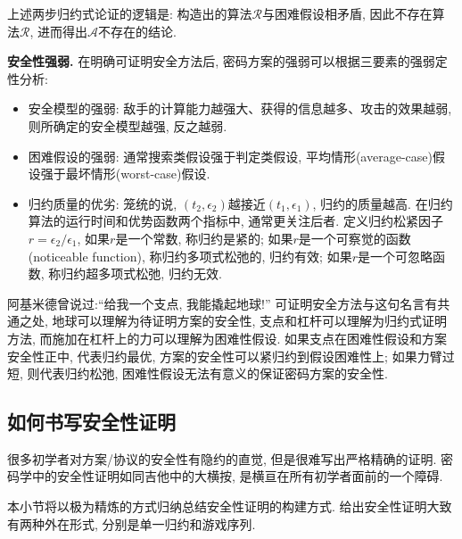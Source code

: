 上述两步归约式论证的逻辑是: 构造出的算法$\mathcal{R}$与困难假设相矛盾, 因此不存在算法$\mathcal{R}$, 进而得出$\mathcal{A}$不存在的结论. 

\begin{trivlist}
\item \textbf{安全性强弱.} 在明确可证明安全方法后, 密码方案的强弱可以根据三要素的强弱定性分析: 
\begin{itemize}
	\item 安全模型的强弱: 敌手的计算能力越强大、获得的信息越多、攻击的效果越弱, 则所确定的安全模型越强, 反之越弱. 
	\item 困难假设的强弱: 通常搜索类假设强于判定类假设, 平均情形(average-case)假设强于最坏情形(worst-case)假设. 
	\item 归约质量的优劣: 笼统的说, $(t_2, \epsilon_2)$越接近$(t_1, \epsilon_1)$, 归约的质量越高. 
		在归约算法的运行时间和优势函数两个指标中, 通常更关注后者. 定义归约松紧因子$r = \epsilon_2/\epsilon_1$, 
		如果$r$是一个常数, 称归约是紧的; 如果$r$是一个可察觉的函数(noticeable function), 称归约多项式松弛的, 归约有效; 
		如果$r$是一个可忽略函数, 称归约超多项式松弛, 归约无效.  
\end{itemize}
\end{trivlist}

\begin{remark}
阿基米德曾说过:``给我一个支点, 我能撬起地球!'' 可证明安全方法与这句名言有共通之处, 
地球可以理解为待证明方案的安全性, 支点和杠杆可以理解为归约式证明方法, 而施加在杠杆上的力可以理解为困难性假设. 
如果支点在困难性假设和方案安全性正中, 代表归约最优, 方案的安全性可以紧归约到假设困难性上; 如果力臂过短, 则代表归约松弛, 困难性假设无法有意义的保证密码方案的安全性.  
\end{remark}

\subsection{如何书写安全性证明}
很多初学者对方案/协议的安全性有隐约的直觉, 但是很难写出严格精确的证明. 密码学中的安全性证明如同吉他中的大横按, 
是横亘在所有初学者面前的一个障碍. 

本小节将以极为精炼的方式归纳总结安全性证明的构建方式. 
给出安全性证明大致有两种外在形式, 分别是单一归约和游戏序列.

